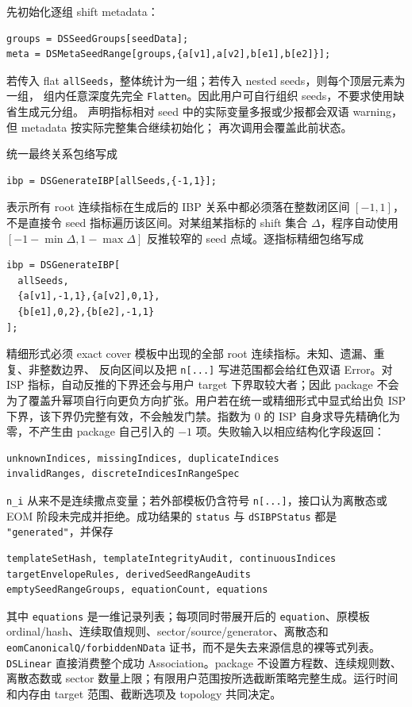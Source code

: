 ﻿\documentclass[a4paper,11pt]{article}
\begin{document}
先初始化逐组 shift metadata：
\begin{verbatim}
groups = DSSeedGroups[seedData];
meta = DSMetaSeedRange[groups,{a[v1],a[v2],b[e1],b[e2]}];
\end{verbatim}
若传入 flat \texttt{allSeeds}，整体统计为一组；若传入 nested seeds，则每个顶层元素为一组，
组内任意深度先完全 \texttt{Flatten}。因此用户可自行组织 seeds，不要求使用缺省生成元分组。
声明指标相对 seed 中的实际变量多报或少报都会双语 warning，但 metadata 按实际完整集合继续初始化；
再次调用会覆盖此前状态。

统一最终关系包络写成
\begin{verbatim}
ibp = DSGenerateIBP[allSeeds,{-1,1}];
\end{verbatim}
表示所有 root 连续指标在生成后的 IBP 关系中都必须落在整数闭区间 $[-1,1]$，不是直接令
seed 指标遍历该区间。对某组某指标的 shift 集合 $\Delta$，程序自动使用
$[-1-\min\Delta,1-\max\Delta]$ 反推较窄的 seed 点域。逐指标精细包络写成
\begin{verbatim}
ibp = DSGenerateIBP[
  allSeeds,
  {a[v1],-1,1},{a[v2],0,1},
  {b[e1],0,2},{b[e2],-1,1}
];
\end{verbatim}
精细形式必须 exact cover 模板中出现的全部 root 连续指标。未知、遗漏、重复、非整数边界、
反向区间以及把 \texttt{n[...]} 写进范围都会给红色双语 Error。对 ISP 指标，自动反推的下界还会与用户 target 下界取较大者；因此 package 不会为了覆盖升幂项自行向更负方向扩张。用户若在统一或精细形式中显式给出负 ISP 下界，该下界仍完整有效，不会触发门禁。指数为 $0$ 的 ISP 自身求导先精确化为零，不产生由 package 自己引入的 $-1$ 项。失败输入以相应结构化字段返回：
\begin{verbatim}
unknownIndices, missingIndices, duplicateIndices
invalidRanges, discreteIndicesInRangeSpec
\end{verbatim}

\texttt{n\_i} 从来不是连续撒点变量；若外部模板仍含符号 \texttt{n[...]}，接口认为离散态或
EOM 阶段未完成并拒绝。成功结果的 \texttt{status} 与 \texttt{dSIBPStatus} 都是
\texttt{"generated"}，并保存
\begin{verbatim}
templateSetHash, templateIntegrityAudit, continuousIndices
targetEnvelopeRules, derivedSeedRangeAudits
emptySeedRangeGroups, equationCount, equations
\end{verbatim}
其中 \texttt{equations} 是一维记录列表；每项同时带展开后的 \texttt{equation}、原模板
ordinal/hash、连续取值规则、sector/source/generator、离散态和
\texttt{eomCanonicalQ/forbiddenNData} 证书，而不是失去来源信息的裸等式列表。
\texttt{DSLinear} 直接消费整个成功 Association。package 不设置方程数、连续规则数、离散态数或
sector 数量上限；有限用户范围按所选截断策略完整生成。运行时间和内存由 target 范围、截断选项及
topology 共同决定。
\end{document}
